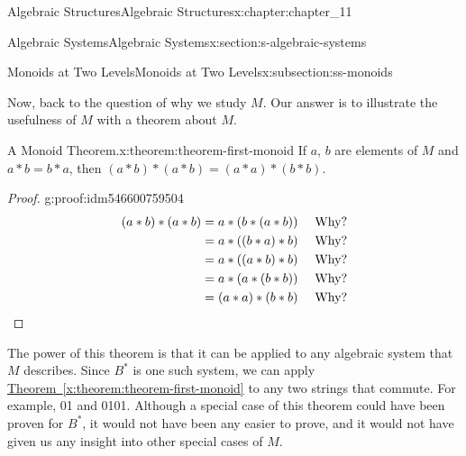 \documentclass[oneside,10pt,]{book}
\newcommand{\xreffont}{\relax}
\newcommand{\qedhere}{\relax}
\numberwithin{equation}{section}
\begin{document}
\begin{chapterptx}{Algebraic Structures}{}{Algebraic Structures}{}{}{x:chapter:chapter_11}
\begin{sectionptx}{Algebraic Systems}{}{Algebraic Systems}{}{}{x:section:s-algebraic-systems}
\begin{subsectionptx}{Monoids at Two Levels}{}{Monoids at Two Levels}{}{}{x:subsection:ss-monoids}
\par
Now, back to the question of why we study \(M\). Our answer is to illustrate the usefulness of \(M\) with a theorem about \(M\).%
\begin{theorem}{A Monoid Theorem.}{}{x:theorem:theorem-first-monoid}%
If \(a\), \(b\) are elements of \(M\) and \(a * b = b * a\), then \((a * b) * (a * b) = (a * a) * (b * b)\).%
\end{theorem}
\begin{proof}{}{g:proof:idm546600759504}
%
\begin{equation*}
\begin{split}
(a*b)*(a*b) &=a*(b*(a*b))\quad \textrm{   Why?} \\
&=a* ((b*a)*b)\quad \textrm{   Why?}\\
&= a*((a*b)*b)\quad \textrm{   Why?}\\
&= a*(a*(b*b))\quad \textrm{   Why?}\\ 
&= (a*a)*(b*b)\quad \textrm{   Why?}
\end{split}\qedhere
\end{equation*}
%
\end{proof}
The power of this theorem is that it can be applied to any algebraic system that \(M\) describes. Since \(B^*\) is one such system, we can apply \hyperref[x:theorem:theorem-first-monoid]{Theorem~{\xreffont\ref{x:theorem:theorem-first-monoid}}} to any two strings that commute. For example, 01 and 0101. Although a special case of this theorem could have been proven for \(B^*\), it would not have been any easier to prove, and it would not have given us any insight into other special cases of \(M\).%
\end{subsectionptx}
\end{sectionptx}
\end{chapterptx}
\end{document}
